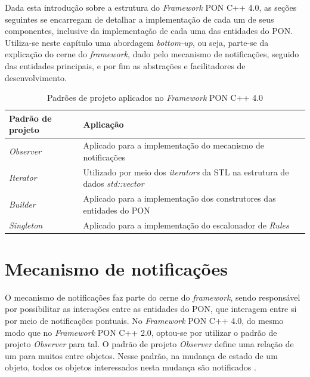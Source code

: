 Dada esta introdução sobre a estrutura do \textit{Framework} PON C++ 4.0, as
seções seguintes se encarregam de detalhar a implementação de cada um de seus
componentes, inclusive da implementação de cada uma das entidades do PON.
Utiliza-se neste capítulo uma abordagem \textit{bottom-up}, ou seja, parte-se da
explicação do cerne do \textit{framework}, dado pelo mecanismo de notificações,
seguido das entidades principais, e por fim as abstrações e facilitadores de
desenvolvimento.

\begin{table}[!htb]
    \centering
    \caption{Padrões de projeto aplicados no \textit{Framework} PON C++ 4.0}
    \smallskip
    \begin{tabularx}{\textwidth}{|l|X|}\hline
        Padrão de projeto & Aplicação   \\\hline\hline
        \textit{Observer} & Aplicado para a implementação do mecanismo de notificações \\ \hline%
        \textit{Iterator} & Utilizado por meio dos \textit{iterators} da STL na estrutura de dados \textit{std::vector} \\ \hline
        \textit{Builder} & Aplicado para a implementação dos construtores das entidades do PON \\ \hline%
        \textit{Singleton} & Aplicado para a implementação do escalonador de
        \textit{Rules} \\ \hline%
    \end{tabularx}
    \label{tab:padroes}
    \end{table}

\section{Mecanismo de notificações}\label{sec:observer}

O mecanismo de notificações faz parte do cerne do \textit{framework}, sendo
responsável por possibilitar as interações entre as entidades do PON, que
interagem entre si por meio de notificações pontuais. No \textit{Framework} PON
C++ 4.0, do mesmo modo que no \textit{Framework} PON C++ 2.0, optou-se por
utilizar o padrão de projeto \textit{Observer} para tal. O padrão de projeto
\textit{Observer} define uma relação de um para muitos entre objetos. Nesse
padrão, na mudança de estado de um objeto, todos os objetos interessados nesta
mudança são notificados \cite{gamma_1995,msc_Ronszcka_2012}.

